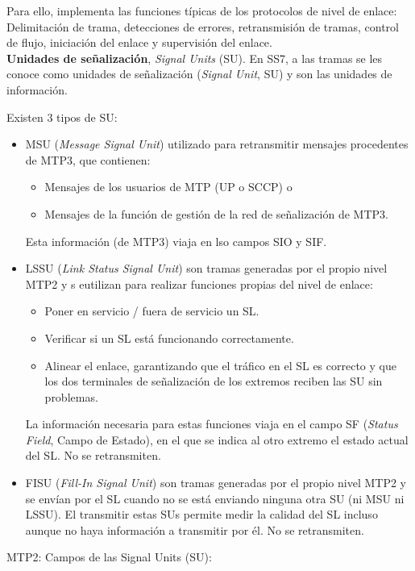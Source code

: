 \documentclass[10pt,portrait, twocolumn]{article}
\begin{document}
	\quad Para ello, implementa las funciones típicas de los protocolos de nivel de enlace: Delimitación de trama, detecciones de errores, retransmisión de tramas, control de flujo, iniciación del enlace y supervisión del enlace.\\
	
\textbf{Unidades de señalización}, \textit{Signal Units} (SU). En SS7, a las tramas se les conoce como unidades de señalización (\textit{Signal Unit}, SU) y son las unidades de información. 

	\quad Existen 3 tipos de SU:
	
	\begin{itemize}
	\item MSU (\textit{Message Signal Unit}) utilizado para retransmitir mensajes procedentes de MTP3, que contienen:
		\begin{itemize}
		\item Mensajes de los usuarios de MTP (UP o SCCP) o
		\item Mensajes de la función de gestión de la red de señalización de MTP3.
		\end{itemize}
		Esta información (de MTP3) viaja en lso campos SIO y SIF.
	\item LSSU (\textit{Link Status Signal Unit}) son tramas generadas por el propio nivel MTP2 y s eutilizan para realizar funciones propias del nivel de enlace:
		\begin{itemize}
		\item Poner en servicio / fuera de servicio un SL.
		\item Verificar si un SL está funcionando correctamente.
		\item Alinear el enlace, garantizando que el tráfico en el SL es correcto y que los dos terminales de señalización de los extremos reciben las SU sin problemas.
		\end{itemize}
		La información necesaria para estas funciones viaja en el campo SF (\textit{Status Field}, Campo de Estado), en el que se indica al otro extremo el estado actual del SL. No se retransmiten.
	\item FISU (\textit{Fill-In Signal Unit}) son tramas generadas por el propio nivel MTP2 y se envían por el SL cuando no se está enviando ninguna otra SU (ni MSU ni LSSU). El transmitir estas SUs permite medir la calidad del SL incluso aunque no haya información a transmitir por él. No se retransmiten.
	\end{itemize}

MTP2: Campos de las Signal Units (SU):
\end{document}
